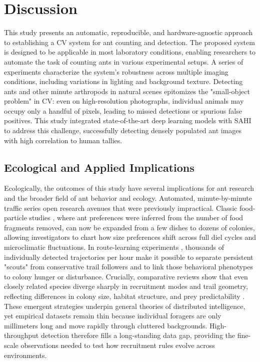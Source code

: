 \section{Discussion}

This study presents an automatic, reproducible, and hardware-agnostic approach to establishing a CV system for ant counting and detection. The proposed system is designed to be applicable in most laboratory conditions, enabling researchers to automate the task of counting ants in various experimental setups. A series of experiments characterize the system's robustness across multiple imaging conditions, including variations in lighting and background texture. Detecting ants and other minute arthropods in natural scenes epitomizes the "small-object problem" in CV: even on high-resolution photographs, individual animals may occupy only a handful of pixels, leading to missed detections or spurious false positives. This study integrated state-of-the-art deep learning models with SAHI to address this challenge, successfully detecting densely populated ant images with high correlation to human tallies.

\subsection{Ecological and Applied Implications}

Ecologically, the outcomes of this study have several implications for ant research and the broader field of ant behavior and ecology. Automated, minute-by-minute traffic series open research avenues that were previously impractical. Classic food-particle studies \citep{hooper_food_1997}, where ant preferences were inferred from the number of food fragments removed, can now be expanded from a few dishes to dozens of colonies, allowing investigators to chart how size preferences shift across full diel cycles and microclimatic fluctuations. In route-learning experiments \citep{czaczkes_ant_2013, gruter_collective_2015}, thousands of individually detected trajectories per hour make it possible to separate persistent "scouts" from conservative trail followers and to link those behavioral phenotypes to colony hunger or disturbance. Crucially, comparative reviews show that even closely related species diverge sharply in recruitment modes and trail geometry, reflecting differences in colony size, habitat structure, and prey predictability \citep{dejean_foraging_2024}. These emergent strategies underpin general theories of distributed intelligence, yet empirical datasets remain thin because individual foragers are only millimeters long and move rapidly through cluttered backgrounds. High-throughput detection therefore fills a long-standing data gap, providing the fine-scale observations needed to test how recruitment rules evolve across environments.

